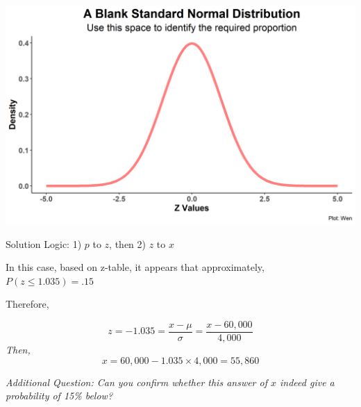 \documentclass{beamer}
\begin{document}
\begin{frame}
\begin{center}
\includegraphics[scale=0.55]{images/standardNormalBlank.png}

\end{center}

\end{frame}



\begin{frame}{Solution Logic: 1) $p$ to $z$, then 2) $z$ to $x$}

In this case, based on z-table, it appears that approximately, $P(z\leq 1.035) = .15$ 

\vspace{0.3 cm}
Therefore, 

$$ z = -1.035 = \frac{x-\mu}{\sigma} = \frac{x - 60,000}{4,000} $$
\textit{Then,} 
$$ x = 60,000 - 1.035 \times 4,000 = 55,860$$

\vspace{0.3 cm}
\textit{Additional Question: Can you confirm whether this answer of $x$ indeed give a probability of 15\% below? 
}
\end{frame}
\end{document}
